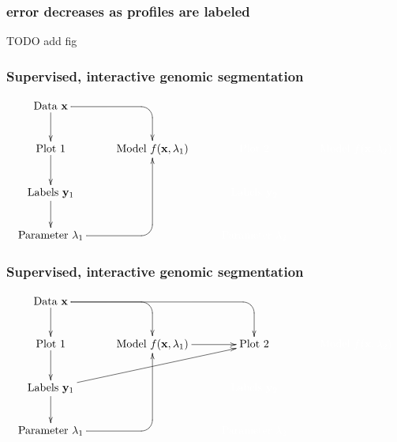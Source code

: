 \documentclass{beamer}
\begin{document}
\begin{frame}
  \frametitle{error decreases as profiles are labeled}
  TODO add fig
\end{frame}

\begin{frame}
  \frametitle{Supervised, interactive genomic segmentation}
  \small
  \begin{displaymath}
  \xymatrix{
    \text{Data $\mathbf x$}
    \ar `[r] [dr] 
    \ar [d]
    & \text{ }
    & \text{ }
    & \text{ }
    \\
    \text{Plot 1} 
    \ar [d]
    & 
    \text{Model $f(\mathbf x, \lambda_1)$} 
    &
    \color{white}{\text{Plot 2} }
    & 
    \color{white}{\text{Model $f(\mathbf x, \lambda_2)$} }
    \\
    \text{Labels $\mathbf y_1$}       
    \ar [d]
    &
    &
    \color{white}{\text{Labels $\mathbf y_2$}}
    \\
    \text{Parameter $\lambda_1$} 
    \ar `r[ruu] [ruu]
    & \text{ }
    & 
    \color{white}{\text{Parameter $\lambda_2$}}
  }
  \end{displaymath}
\end{frame}

\begin{frame}
  \frametitle{Supervised, interactive genomic segmentation}
  \small
  \begin{displaymath}
  \xymatrix{
    \text{Data $\mathbf x$}
    \ar `[r] [dr] 
    \ar `r[rr] [drr] 
    \ar [d]
    & \text{ }
    & \text{ }
    & \text{ }
    \\
    \text{Plot 1} 
    \ar [d]
    & 
    \text{Model $f(\mathbf x, \lambda_1)$} 
    \ar [r]
    &
    \text{Plot 2} 
    & 
    \color{white}{\text{Model $f(\mathbf x, \lambda_2)$} }
    \\
    \text{Labels $\mathbf y_1$}       
    \ar [d]
    \ar [rru]
    &
    &
    \color{white}{\text{Labels $\mathbf y_2$}}
    \\
    \text{Parameter $\lambda_1$} 
    \ar `r[ruu] [ruu]
    & \text{ }
    & 
    \color{white}{\text{Parameter $\lambda_2$}}
  }
  \end{displaymath}
\end{frame}
\end{document}
